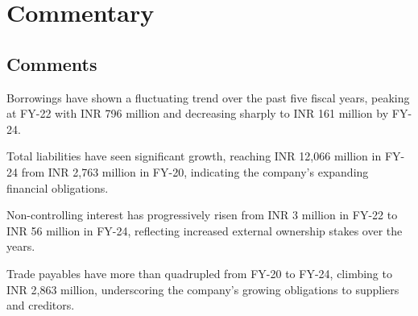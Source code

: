 \documentclass{article}
\begin{document}
\section*{Commentary}
\begin{tcolorbox}[colback=white]
\subsection*{Comments}
    \renewcommand\labelitemi{--}
    
    \item Borrowings have shown a fluctuating trend over the past five fiscal years, peaking at FY-22 with INR 796 million and decreasing sharply to INR 161 million by FY-24.
    
    \item Total liabilities have seen significant growth, reaching INR 12,066 million in FY-24 from INR 2,763 million in FY-20, indicating the company's expanding financial obligations.
    
    \item Non-controlling interest has progressively risen from INR 3 million in FY-22 to INR 56 million in FY-24, reflecting increased external ownership stakes over the years.
    
    \item Trade payables have more than quadrupled from FY-20 to FY-24, climbing to INR 2,863 million, underscoring the company's growing obligations to suppliers and creditors.
    
\end{tcolorbox}
\end{document}
